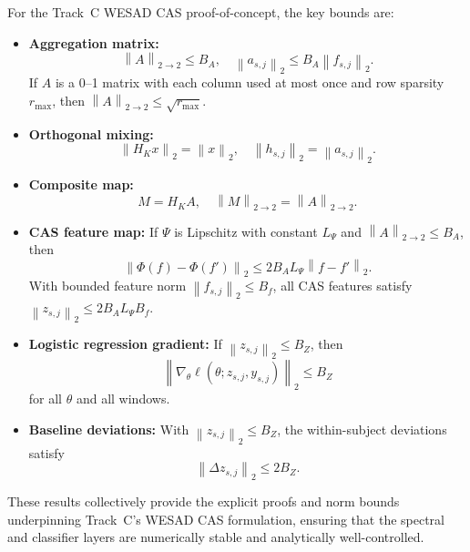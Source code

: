 \documentclass[11pt]{article}
\newcommand{\norm}[1]{\left\lVert #1 \right\rVert}
\begin{document}
For the Track~C WESAD CAS proof-of-concept, the key bounds are:

\begin{itemize}
  \item \textbf{Aggregation matrix:}
    \[
      \norm{A}_{2\to2} \le B_A, \quad
      \norm{a_{s,j}}_2 \le B_A \norm{f_{s,j}}_2.
    \]
    If \(A\) is a 0--1 matrix with each column used at most once and row sparsity \(r_{\max}\), then \(\norm{A}_{2\to2} \le \sqrt{r_{\max}}\).
  \item \textbf{Orthogonal mixing:}
    \[
      \norm{H_K x}_2 = \norm{x}_2, \quad
      \norm{h_{s,j}}_2 = \norm{a_{s,j}}_2.
    \]
  \item \textbf{Composite map:}
    \[
      M = H_K A, \quad
      \norm{M}_{2\to2} = \norm{A}_{2\to2}.
    \]
  \item \textbf{CAS feature map:}
    If \(\Psi\) is Lipschitz with constant \(L_\Psi\) and \(\norm{A}_{2\to2} \le B_A\), then
    \[
      \norm{\Phi(f) - \Phi(f')}_2 \le 2 B_A L_\Psi \norm{f-f'}_2.
    \]
    With bounded feature norm \(\norm{f_{s,j}}_2 \le B_f\), all CAS features satisfy \(\norm{z_{s,j}}_2 \le 2 B_A L_\Psi B_f\).
  \item \textbf{Logistic regression gradient:}
    If \(\norm{z_{s,j}}_2 \le B_Z\), then
    \[
      \norm{\nabla_\theta \ell(\theta; z_{s,j}, y_{s,j})}_2 \le B_Z
    \]
    for all \(\theta\) and all windows.
  \item \textbf{Baseline deviations:}
    With \(\norm{z_{s,j}}_2 \le B_Z\), the within-subject deviations satisfy
    \[
      \norm{\Delta z_{s,j}}_2 \le 2 B_Z.
    \]
\end{itemize}

These results collectively provide the explicit proofs and norm bounds underpinning Track~C’s WESAD CAS formulation, ensuring that the spectral and classifier layers are numerically stable and analytically well-controlled.


\nocite{*}
  
  
\end{document}

